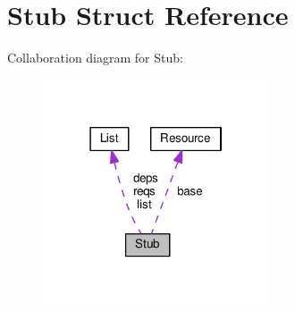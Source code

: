 \hypertarget{structStub}{}\section{Stub Struct Reference}
\label{structStub}


Collaboration diagram for Stub\+:\nopagebreak
\begin{figure}[H]
\begin{center}
\leavevmode
\includegraphics[width=190pt]{structStub__coll__graph}
\end{center}
\end{figure}
